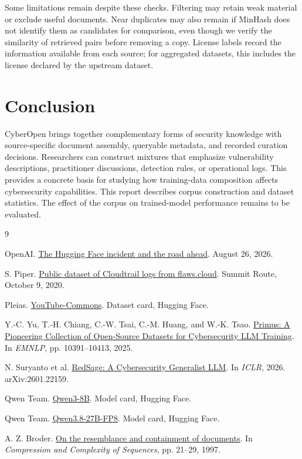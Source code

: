 \documentclass[10pt,twocolumn]{article}
\begin{document}
Some limitations remain despite these checks. Filtering may retain weak
material or exclude useful documents. Near duplicates may also remain if
MinHash does not identify them as candidates for comparison, even though
we verify the similarity of retrieved pairs before removing a copy.
License labels record the information available from each source; for
aggregated datasets, this includes the license declared by the upstream
dataset.

\section{Conclusion}

CyberOpen brings together complementary forms of security knowledge with
source-specific document assembly, queryable metadata, and recorded curation
decisions. Researchers can construct mixtures that emphasize vulnerability
descriptions, practitioner discussions, detection rules, or operational logs.
This provides a concrete basis for studying how training-data composition
affects cybersecurity capabilities. This report describes corpus construction and dataset statistics. The effect of the corpus on trained-model performance remains to be evaluated.

\balance
\begingroup
\small
\begin{thebibliography}{9}
\setlength{\itemsep}{3pt}
\setlength{\parskip}{0pt}
\raggedright
{}

OpenAI.
\href{https://openai.com/index/hugging-face-incident-and-the-road-ahead/}{The Hugging Face incident and the road ahead}.
August 26, 2026.

S. Piper.
\href{https://summitroute.com/blog/2020/10/09/public_dataset_of_cloudtrail_logs_from_flaws_cloud/}{Public dataset of Cloudtrail logs from flaws.cloud}.
Summit Route, October 9, 2020.

Pleias.
\href{https://huggingface.co/datasets/PleIAs/YouTube-Commons}{YouTube-Commons}.
Dataset card, Hugging Face.

Y.-C. Yu, T.-H. Chiang, C.-W. Tsai, C.-M. Huang, and W.-K. Tsao.
\href{https://aclanthology.org/2025.emnlp-main.527/}{Primus: A Pioneering Collection of Open-Source Datasets for Cybersecurity LLM Training}.
In \emph{EMNLP}, pp. 10391--10413, 2025.

N. Suryanto et al.
\href{https://arxiv.org/abs/2601.22159}{RedSage: A Cybersecurity Generalist LLM}.
In \emph{ICLR}, 2026. arXiv:2601.22159.

Qwen Team.
\href{https://huggingface.co/Qwen/Qwen3-8B}{Qwen3-8B}.
Model card, Hugging Face.

Qwen Team.
\href{https://huggingface.co/Qwen/Qwen3.8-27B-FP8}{Qwen3.8-27B-FP8}.
Model card, Hugging Face.

A. Z. Broder.
\href{https://doi.org/10.1109/SEQUEN.1997.666900}{On the resemblance and containment of documents}.
In \emph{Compression and Complexity of Sequences}, pp. 21--29, 1997.

\end{thebibliography}
\endgroup
\end{document}
